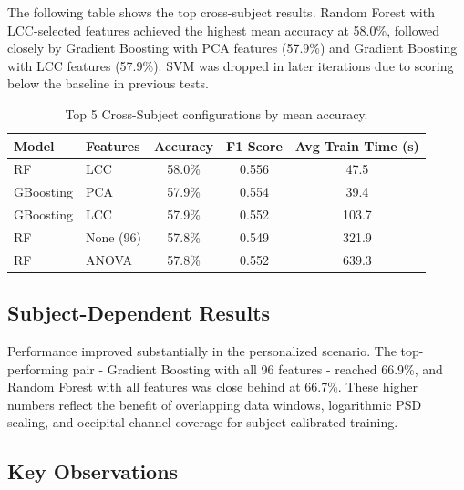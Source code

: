 \documentclass[12pt]{article}
\begin{document}
The following table shows the top cross-subject results. Random Forest with LCC-selected features achieved the highest mean accuracy at 58.0\%, followed closely by Gradient Boosting with PCA features (57.9\%) and Gradient Boosting with LCC features (57.9\%). SVM was dropped in later iterations due to scoring below the baseline in previous tests.

\begin{table}[H]
\centering
\caption{Top 5 Cross-Subject configurations by mean accuracy.}
\label{tab:cross}
\begin{tabular}{llccc}
\toprule
Model & Features & Accuracy & F1 Score & Avg Train Time (s) \\
\midrule
RF & LCC & 58.0\% & 0.556 & 47.5 \\
GBoosting & PCA & 57.9\% & 0.554 & 39.4 \\
GBoosting & LCC & 57.9\% & 0.552 & 103.7 \\
RF & None (96) & 57.8\% & 0.549 & 321.9 \\
RF & ANOVA & 57.8\% & 0.552 & 639.3 \\
\bottomrule
\end{tabular}
\end{table}

\subsection{Subject-Dependent Results}

Performance improved substantially in the personalized scenario. The top-performing pair - Gradient Boosting with all 96 features - reached 66.9\%, and Random Forest with all features was close behind at 66.7\%. These higher numbers reflect the benefit of overlapping data windows, logarithmic PSD scaling, and occipital channel coverage for subject-calibrated training.

\subsection{Key Observations}
\end{document}
